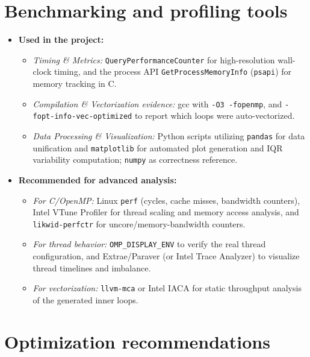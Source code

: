 \documentclass[12pt,a4paper]{article}
\begin{document}
\section{Benchmarking and profiling tools}
\label{sec:tools}

\begin{itemize}
\item \textbf{Used in the project:}
\begin{itemize}
\item \textit{Timing \& Metrics:} \texttt{QueryPerformanceCounter} for
high-resolution wall-clock timing, and the process API
\texttt{GetProcessMemoryInfo} (\texttt{psapi}) for memory tracking in C.
\item \textit{Compilation \& Vectorization evidence:} gcc with
\texttt{-O3 -fopenmp}, and \texttt{-fopt-info-vec-optimized} to report which
loops were auto-vectorized.
\item \textit{Data Processing \& Visualization:} Python scripts utilizing
\texttt{pandas} for data unification and \texttt{matplotlib} for automated
plot generation and IQR variability computation; \texttt{numpy} as
correctness reference.
\end{itemize}
\item \textbf{Recommended for advanced analysis:}
\begin{itemize}
\item \textit{For C/OpenMP:} Linux \texttt{perf} (cycles, cache misses,
bandwidth counters), Intel VTune Profiler for thread scaling and memory
access analysis, and \texttt{likwid-perfctr} for uncore/memory-bandwidth
counters.
\item \textit{For thread behavior:} \texttt{OMP\_DISPLAY\_ENV} to verify
the real thread configuration, and Extrae/Paraver (or Intel Trace Analyzer)
to visualize thread timelines and imbalance.
\item \textit{For vectorization:} \texttt{llvm-mca} or Intel IACA for
static throughput analysis of the generated inner loops.
\end{itemize}
\end{itemize}

\section{Optimization recommendations}
\label{sec:opt}
\end{document}
